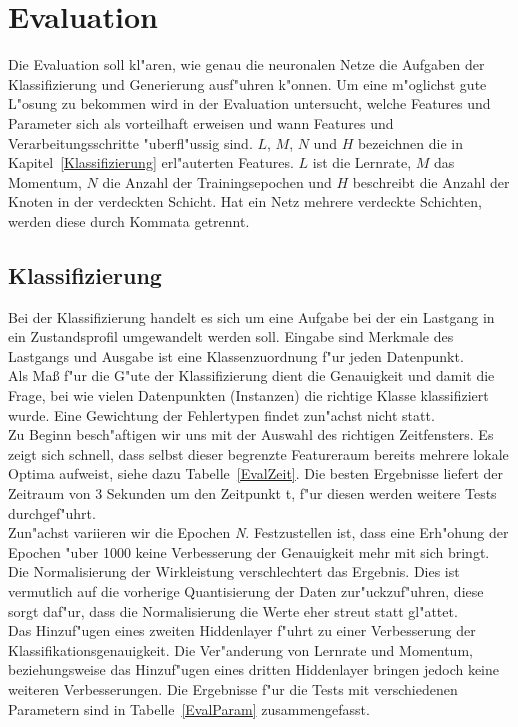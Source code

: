 \section{Evaluation}
\label{Evaluation}

Die Evaluation soll kl"aren, wie genau die neuronalen Netze die Aufgaben der Klassifizierung und Generierung ausf"uhren k"onnen. Um eine m"oglichst gute L"osung zu bekommen wird in der Evaluation untersucht, welche Features und Parameter sich als vorteilhaft erweisen und wann Features und Verarbeitungsschritte "uberfl"ussig sind. $L$, $M$, $N$ und $H$ bezeichnen die in Kapitel~\ref{Klassifizierung} erl"auterten Features. $L$ ist die Lernrate, $M$ das Momentum, $N$ die Anzahl der Trainingsepochen und $H$ beschreibt die Anzahl der Knoten in der verdeckten Schicht. Hat ein Netz mehrere verdeckte Schichten, werden diese durch Kommata getrennt.

\subsection{Klassifizierung}
\label{EvalKlassifizierung}
Bei der Klassifizierung handelt es sich um eine Aufgabe bei der ein Lastgang in ein Zustandsprofil umgewandelt werden soll. Eingabe sind Merkmale des Lastgangs und Ausgabe ist eine Klassenzuordnung f"ur jeden Datenpunkt.\\
Als Ma{\ss} f"ur die G"ute der Klassifizierung dient die Genauigkeit und damit die Frage, bei wie vielen Datenpunkten (Instanzen) die richtige Klasse klassifiziert wurde. Eine Gewichtung der Fehlertypen findet zun"achst nicht statt.\\

Zu Beginn besch"aftigen wir uns mit der Auswahl des richtigen Zeitfensters. Es zeigt sich schnell, dass selbst dieser begrenzte Featureraum bereits mehrere lokale Optima aufweist, siehe dazu Tabelle~\ref{EvalZeit}. Die besten Ergebnisse liefert der Zeitraum von 3 Sekunden um den Zeitpunkt t, f"ur diesen werden weitere Tests durchgef"uhrt.\\

Zun"achst variieren wir die Epochen \textit{N}. Festzustellen ist, dass eine Erh"ohung der Epochen "uber 1000 keine Verbesserung der Genauigkeit mehr mit sich bringt. Die Normalisierung der Wirkleistung verschlechtert das Ergebnis. Dies ist vermutlich auf die vorherige Quantisierung der Daten zur"uckzuf"uhren, diese sorgt daf"ur, dass die Normalisierung die Werte eher streut statt gl"attet. \\
Das Hinzuf"ugen eines zweiten Hiddenlayer f"uhrt zu einer Verbesserung der Klassifikationsgenauigkeit. Die Ver"anderung von Lernrate und Momentum, beziehungsweise das Hinzuf"ugen eines dritten Hiddenlayer bringen jedoch keine weiteren Verbesserungen. Die Ergebnisse f"ur die Tests mit verschiedenen Parametern sind in Tabelle~\ref{EvalParam} zusammengefasst.\\

